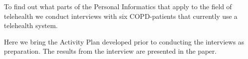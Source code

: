 To find out what parts of the Personal Informatics that apply to the field of telehealth we conduct interviews with six COPD-patients that currently use a telehealth system. 

Here we bring the Activity Plan developed prior to conducting the interviews as preparation. The results from the interview are presented in the paper.  